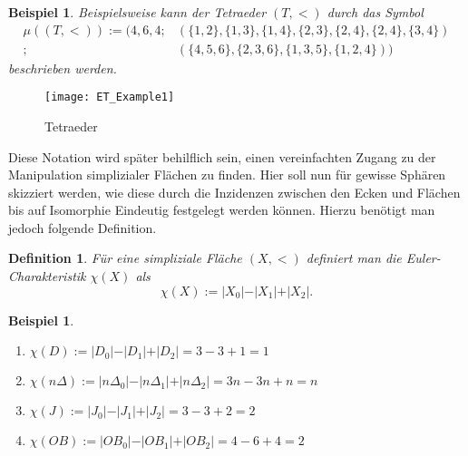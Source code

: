 \documentclass[12pt,titlepage,twoside,cleardoublepage]{article}
\theoremstyle{nummermitklammern}
\newtheorem{vor}[temp]{Vorüberlegung}
\newtheorem{bsp}[temp]{Beispiel}
\newtheorem{definition}[temp]{Definition}
\newtheorem{definition}[zahl]{Definition}
\newtheorem{vor}[zahl]{Vorüberlegung}
\newtheorem{bsp}[zahl]{Beispiel}
\numberwithin{equation}{section}
\begin{document}
\begin{bsp}
Beispielsweise kann der Tetraeder $(T,<)$ durch das Symbol 
\begin{align*}
\mu ((T,<)):=(4,6,4;&(\{1,2\}, \{1,3\},\{1,4\},\{2,3\},\{2,4\},\{2,4\},\{3,4\})\\
;&(\{4,5,6\},\{2,3,6\},\{1,3,5\},\{1,2,4\}))
\end{align*}
beschrieben werden.
\end{bsp}
\begin{figure}[H]
\begin{center}
\texttt{[image: ET\_Example1]}
\end{center}
\caption{Tetraeder}
\end{figure}

Diese Notation wird später behilflich sein, einen vereinfachten Zugang zu der Manipulation simplizialer Flächen zu finden. Hier soll nun für gewisse Sphären skizziert werden, wie diese durch die Inzidenzen zwischen den Ecken und Flächen bis auf Isomorphie Eindeutig festgelegt werden können. Hierzu benötigt man jedoch folgende Definition.
\begin{definition}
Für eine simpliziale Fläche $(X,<)$ definiert man die Euler-Charakteristik $\chi (X)$ als 
\[
\chi(X):=\vert X_0\vert-\vert X_1\vert+\vert X_2\vert.
\]
\end{definition}
\begin{bsp}
\begin{enumerate}
Betrachtet man die im obigem Beispiel eingeführten simplizialen Flächen, so erhält man folgende Euler-Charakteristiken:
\item $\chi(D):=\vert D_0\vert-\vert D_1\vert+\vert D_2\vert=3-3+1=1$
\item $\chi(n\Delta):=\vert n\Delta_0\vert-\vert n\Delta_1\vert+\vert n\Delta_2\vert=3n-3n+n=n$
\item $\chi(J):=\vert J_0\vert-\vert J_1\vert+\vert J_2\vert=3-3+2=2$
\item $\chi(OB):=\vert OB_0\vert-\vert OB_1\vert+\vert OB_2\vert=4-6+4=2$
\end{enumerate}
\end{bsp}


\end{document}
